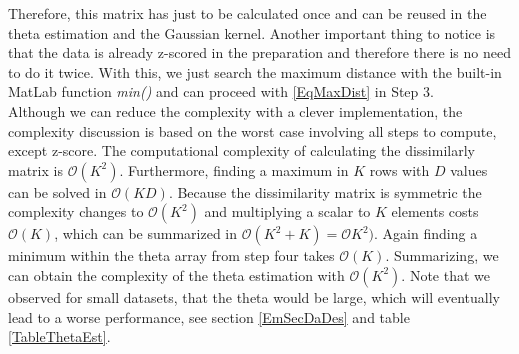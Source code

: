 Therefore, this matrix has just to be calculated once and can be reused in the theta estimation and the Gaussian kernel.
Another important thing to notice is that the data is already z-scored in the preparation and therefore there is no need to do it twice.
With this, we just search the maximum distance with the built-in MatLab function \textit{min()} and can proceed with \eqref{EqMaxDist} in Step 3.\\
Although we can reduce the complexity with a clever implementation, the complexity discussion is based on the worst case involving all steps to compute, except z-score.
The computational complexity of calculating the dissimilarly matrix is $\mathcal{O}(K^2)$.\cite{Kobti.2007}
Furthermore, finding a maximum in $K$ rows with $D$ values can be solved in $\mathcal{O}(KD)$.
Because the dissimilarity matrix is symmetric the complexity changes to $\mathcal{O}(K^2)$ and multiplying a scalar to $K$ elements costs $\mathcal{O}(K)$, which can be summarized in $\mathcal{O}(K^2+K)=\mathcal{O}K^2)$.
Again finding a minimum within the theta array from step four takes $\mathcal{O}(K)$.
Summarizing, we can obtain the complexity of the theta estimation with $\mathcal{O}(K^2)$.
Note that we observed for small datasets, that the theta would be large, which will eventually lead to a worse performance, see section \ref{EmSecDaDes} and table \ref{TableThetaEst}.
